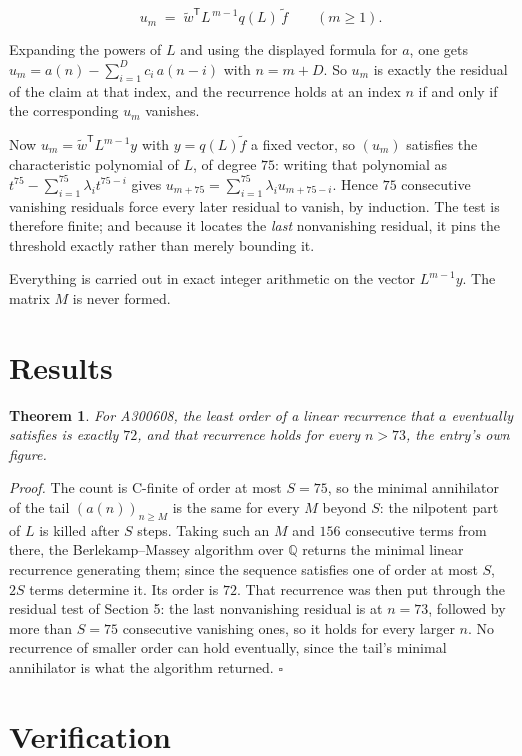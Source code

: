 \documentclass[11pt]{article}
\newtheorem{theorem}{Theorem}
\theoremstyle{definition}
\begin{document}
\[u_m \;=\; \tilde w^{\mathsf T} L^{\,m-1} q(L)\,\tilde f \qquad (m \ge 1).\]

Expanding the powers of $L$ and using the displayed formula for $a$, one gets $u_m = a(n) - \sum_{i=1}^{D} c_i\,a(n-i)$ with $n = m + D$. So $u_m$ is exactly the residual of the claim at that index, and the recurrence holds at an index $n$ if and only if the corresponding $u_m$ vanishes.

Now $u_m = \tilde w^{\mathsf T} L^{m-1} y$ with $y = q(L)\tilde f$ a fixed vector, so $(u_m)$ satisfies the characteristic polynomial of $L$, of degree $75$: writing that polynomial as $t^{75} - \sum_{i=1}^{75} \lambda_i t^{75-i}$ gives $u_{m+75} = \sum_{i=1}^{75} \lambda_i u_{m+75-i}$. Hence $75$ consecutive vanishing residuals force every later residual to vanish, by induction. The test is therefore finite; and because it locates the {\itshape last} nonvanishing residual, it pins the threshold exactly rather than merely bounding it.

Everything is carried out in exact integer arithmetic on the vector $L^{m-1}y$. The matrix $M$ is never formed.

\section{Results}

\begin{theorem} For A300608, the least order of a linear recurrence that $a$ eventually satisfies is exactly $72$, and that recurrence holds for every $n > 73$, the entry's own figure.\end{theorem}

{\itshape Proof.} The count is C-finite of order at most $S = 75$, so the minimal annihilator of the tail $(a(n))_{n \ge M}$ is the same for every $M$ beyond $S$: the nilpotent part of $L$ is killed after $S$ steps. Taking such an $M$ and $156$ consecutive terms from there, the Berlekamp--Massey algorithm over $\mathbb{Q}$ returns the minimal linear recurrence generating them; since the sequence satisfies one of order at most $S$, $2S$ terms determine it. Its order is $72$. That recurrence was then put through the residual test of Section 5: the last nonvanishing residual is at $n = 73$, followed by more than $S = 75$ consecutive vanishing ones, so it holds for every larger $n$. No recurrence of smaller order can hold eventually, since the tail's minimal annihilator is what the algorithm returned. $\square$

\section{Verification}
\end{document}
